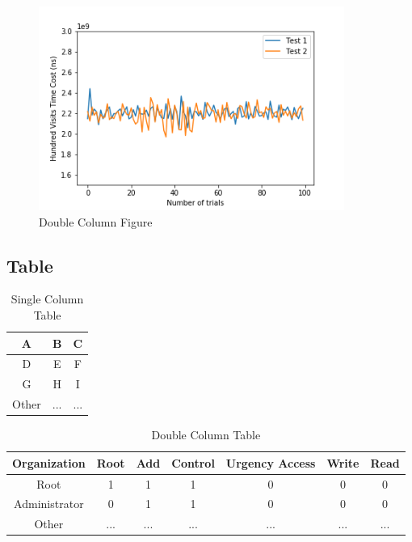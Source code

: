 \documentclass[conference]{IEEEtran}
\begin{document}
\begin{figure}[htbp]
  \centering
  \includegraphics[width=10cm]{figures/Query_Label.png}
  \caption{Double Column Figure\label{DoubleColumnFigure}}
\end{figure}

\subsection{Table}
\begin{table}[http]
  \centering
  \caption{Single Column Table}
  \label{SingleColumnTable}
  \begin{tabular}{c|cc}
    \hline\hline
    A & B & C \\
    \hline
    D & E & F \\
    G & H & I \\
    Other & ... & ... \\
    \hline\hline
  \end{tabular}
\end{table}

\begin{table}[http]
  \renewcommand{\arraystretch}{2}
  \centering
  \caption{Double Column Table}
  \label{DoubleColumnTable}
  \begin{tabular}{ccccccc}
    \hline \hline
    Organization & Root & Add & Control & Urgency Access & Write & Read \\
    \hline
    Root & 1    & 1   & 1       & 0              & 0     & 0    \\
    Administrator&0&1 & 1       & 0              & 0     & 0    \\
    Other & ... & ... & ...     & ...            & ...   & ...  \\
    \hline \hline
  \end{tabular}
\end{table}
\end{document}
